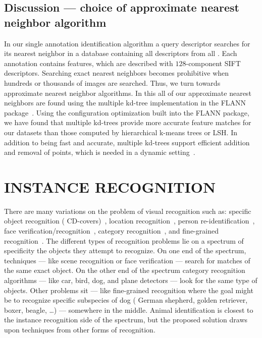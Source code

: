     \subsection{Discussion --- choice of approximate nearest neighbor algorithm}
        In our single annotation identification algorithm a query descriptor searches for its nearest neighbor in a
        database containing all descriptors from all \exemplars{}. Each annotation contains 
        features, which are described with $128$-component SIFT descriptors. Searching exact nearest neighbors
        becomes prohibitive when hundreds or thousands of images are searched. Thus, we turn towards approximate
        nearest neighbor algorithms. In this \thesis{} all of our approximate nearest neighbors are found using the
        multiple kd-tree implementation in the FLANN package~\cite{muja_fast_2009}. Using the configuration
        optimization built into the FLANN package, we have found that multiple kd-trees provide more accurate
        feature matches for our datasets than those computed by hierarchical k-means trees or LSH{}. In addition to
        being fast and accurate, multiple kd-trees support efficient addition and removal of points, which is
        needed in a dynamic setting~\cite{silpa_anan_optimised_2008}.


\section{INSTANCE RECOGNITION}\label{sec:ir}
    There are many variations on the problem of visual recognition such as: specific object recognition (\eg{}
    CD-covers)~\cite{lowe_distinctive_2004, sivic_efficient_2009, nister_scalable_2006},
    location recognition~\cite{jegou_hamming_2008,jegou_aggregating_2012,tolias_aggregate_2013},
    person re-identification~\cite{shi_embedding_2016,karanam_person_2015,wu_viewpoint_2015},
    face verification/recognition~\cite{chopra_learning_2005, huang_labeled_2007, berg_tom_vs_pete_2012,
    chen_blessing_2013, taigman_deepface_2014, schroff_facenet_2015},
    category recognition~\cite{lazebnik_beyond_2006,zhang_local_2006,mccann_local_2012,boiman_defense_2008},
    and fine-grained recognition~\cite{parkhi_cats_2012,berg_poof_2013, gavves_local_2014}.
    The different types of recognition problems lie on a spectrum of specificity \wrt{} the objects they attempt to
    recognize. On one end of the spectrum,  techniques --- like scene recognition
    or face verification --- search for matches of the same exact object. On the other end of the spectrum category
    recognition algorithms --- like car, bird, dog, and plane detectors --- look for the same type of objects.
    Other problems sit --- like fine-grained recognition where the goal might be to recognize specific subspecies
    of dog (\eg{} German shepherd, golden retriever, boxer, beagle, \ldots{}) --- somewhere in the middle. Animal
    identification is closest to the instance recognition side of the spectrum, but the proposed solution draws
    upon techniques from other forms of recognition.


